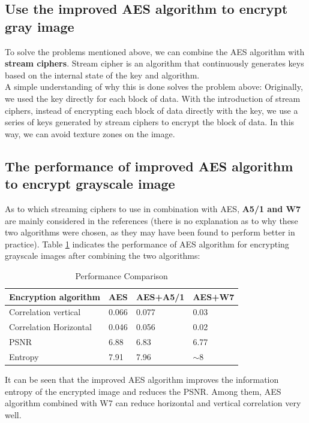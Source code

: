 \documentclass[11pt]{article}
\begin{document}
\subsection{Use the improved AES algorithm to encrypt gray image}
To solve the problems mentioned above, we can combine the AES algorithm with \textbf{stream ciphers}. Stream cipher is an algorithm that continuously generates keys based on the internal state of the key and algorithm.\\
A simple understanding of why this is done solves the problem above: Originally, we used the key directly for each block of data. With the introduction of stream ciphers, instead of encrypting each block of data directly with the key, we use a series of keys generated by stream ciphers to encrypt the block of data. In this way, we can avoid texture zones on the image.

\subsection{The performance of improved AES algorithm to encrypt grayscale image}
As to which streaming ciphers to use in combination with AES, \textbf{A5/1 and W7} are mainly considered in the references (there is no explanation as to why these two algorithms were chosen, as they may have been found to perform better in practice). Table \ref{Tab34} indicates the performance of AES algorithm for encrypting grayscale images after combining the two algorithms:

\begin{table}[htbp]
\centering
\caption{Performance Comparison}
\label{Tab34}
\begin{tabular}{|l|l|l|l|}
\hline
Encryption algorithm   & AES   & AES+A5/1 & AES+W7  \\ \hline
Correlation vertical   & 0.066 & 0.077    & 0.03    \\ \hline
Correlation Horizontal & 0.046 & 0.056    & 0.02    \\ \hline
PSNR                   & 6.88  & 6.83     & 6.77    \\ \hline
Entropy                & 7.91  & 7.96     & $\sim$8 \\ \hline
\end{tabular}
\end{table}

It can be seen that the improved AES algorithm improves the information entropy of the encrypted image and reduces the PSNR. Among them, AES algorithm combined with W7 can reduce horizontal and vertical correlation very well.
\end{document}
